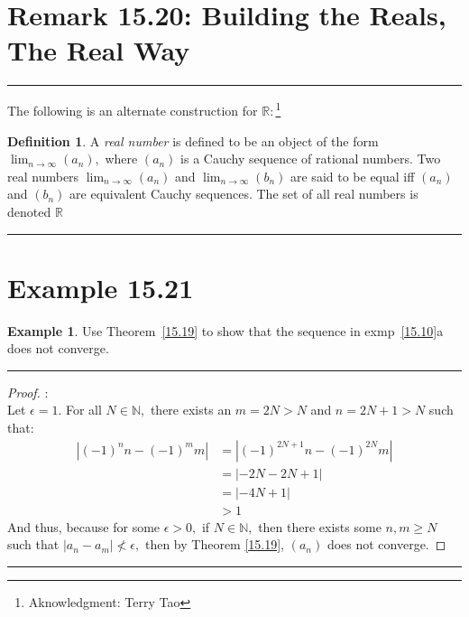 \documentclass[openany, amssymb, psamsfonts]{amsart}
\newcommand{\bbN}{\mathbb{N}}
\newcommand{\bbR}{\mathbb{R}}
\theoremstyle{definition}
\newtheorem{defn}{Definition}[section]
\newtheorem{exmp}{Example}[section]
\numberwithin{equation}{section}
\begin{document}
\section*{Remark 15.20: Building the Reals, The Real Way}
\vspace{4pt}     \hrule   \vspace{4pt}
The following is an alternate construction for $\bbR:$\footnote{Aknowledgment: Terry Tao}\newline\newline
\begin{defn}
    A \textit{real number} is defined to be an
 object of the form $\displaystyle\lim_{n\to \infty}(a_n),$ where $(a_n)$ is a Cauchy sequence of rational numbers. Two real numbers $\displaystyle\lim_{n\to \infty}(a_n)$ and $\displaystyle\lim_{n\to \infty}(b_n)$ are
 said to be equal iff $(a_n)$ and $(b_n)$
  are equivalent Cauchy sequences.
 The set of all real numbers is denoted $\bbR$
\end{defn}
\vspace{4pt}     \hrule   \vspace{4pt}


\section*{Example 15.21}
\begin{exmp} 
Use Theorem~\ref{15.19}  to show that the sequence in exmp~\ref{15.10}a does not converge.
\end{exmp}
\vspace{4pt}     \hrule   \vspace{4pt}\begin{proof}:\\
    Let $\epsilon = 1.$ For all $N\in \bbN,$ there exists an $m=2N>N$ and $n = 2N+1 >N$ such that:
    \begin{align*}
        |(-1)^{n}n - (-1)^mm|&= |(-1)^{2N+1}n - (-1)^{2N}m|\\
        &= |-2N - 2N+1|\\
        &= |-4N+1|\\
        &>1
    \end{align*}
And thus, because for some $\epsilon>0,$ if $N \in \bbN,$ then there exists some $n,m\geq N$ such that $|a_n - a_m|\not < \epsilon,$ then by Theorem \ref{15.19}, $(a_n)$ does not converge.
\end{proof}\vspace{4pt}     \hrule   \vspace{4pt}
\end{document}
